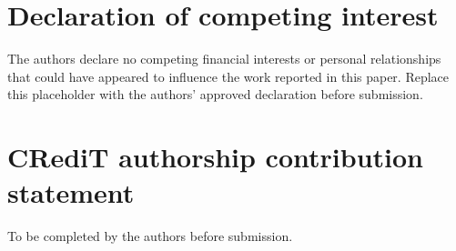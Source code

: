 \documentclass[11pt]{article}
\begin{document}
\section*{Declaration of competing interest}
The authors declare no competing financial interests or personal relationships that could have appeared to influence the work reported in this paper.  Replace this placeholder with the authors' approved declaration before submission.

\section*{CRediT authorship contribution statement}
To be completed by the authors before submission.



\end{document}
